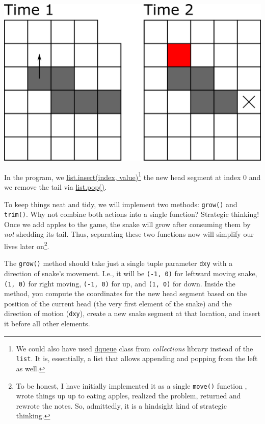 \documentclass[
]{book}
\begin{document}
\includegraphics[width=14.36in]{images/snake-movement-2}

In the program, we \href{https://docs.python.org/3/tutorial/datastructures.html\#more-on-lists}{list.insert(index, value)}\footnote{We could also have used \href{https://docs.python.org/3/library/collections.html\#collections.deque}{dqueue} class from \emph{collections} library instead of the \texttt{list}. It is, essentially, a list that allows appending and popping from the left as well.} the new head segment at index 0 and we remove the tail via \href{https://docs.python.org/3/tutorial/datastructures.html\#more-on-lists}{list.pop()}.

To keep things neat and tidy, we will implement two methods: \texttt{grow()} and \texttt{trim()}. Why not combine both actions into a single function? Strategic thinking! Once we add apples to the game, the snake will grow after consuming them by \emph{not} shedding its tail. Thus, separating these two functions now will simplify our lives later on\footnote{To be honest, I have initially implemented it as a single \texttt{move()} function , wrote things up up to eating apples, realized the problem, returned and rewrote the notes. So, admittedly, it is a hindsight kind of strategic thinking.}.

The \texttt{grow()} method should take just a single tuple parameter \texttt{dxy} with a direction of snake's movement. I.e., it will be \texttt{(-1,\ 0)} for leftward moving snake, \texttt{(1,\ 0)} for right moving, \texttt{(-1,\ 0)} for up, and \texttt{(1,\ 0)} for down. Inside the method, you compute the coordinates for the new head segment based on the position of the current head (the very first element of the snake) and the direction of motion (\texttt{dxy}), create a new snake segment at that location, and insert it before all other elements.
\end{document}
